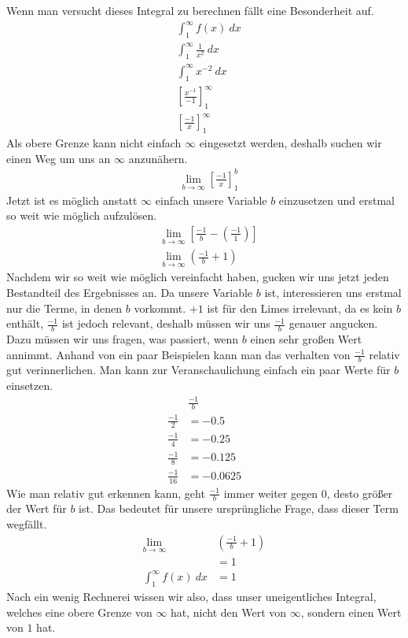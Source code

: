 \begin{flushleft}
    Wenn man versucht dieses Integral zu berechnen fällt eine Besonderheit auf.
    \begin{align}
        &\int_{1}^{\infty} f(x) \ dx \\
        &\int_{1}^{\infty} \frac{1}{x^2} \ dx \\
        &\int_{1}^{\infty} x^{-2} \ dx \\
        &\left[\frac{x^{-1}}{-1}\right]_{1}^{\infty} \\
        &\left[\frac{-1}{x}\right]_{1}^{\infty}
    \end{align}
    Als obere Grenze kann nicht einfach $\infty$ eingesetzt werden, deshalb suchen wir einen Weg um uns an $\infty$ anzunähern.
    \begin{align}
        &\lim_{b \to \infty} \left[ \frac{-1}{x}\right]_{1}^{b}
    \end{align}
    Jetzt ist es möglich anstatt $\infty$ einfach unsere Variable $b$ einzusetzen und erstmal so weit wie möglich aufzulösen.
    \begin{align}
        &\lim_{b \to \infty} \left[ \frac{-1}{b} - \left(\frac{-1}{1}\right)\right] \\
        &\lim_{b \to \infty} \left( \frac{-1}{b} + 1\right)
    \end{align}
    Nachdem wir so weit wie möglich vereinfacht haben, gucken wir uns jetzt jeden Bestandteil des Ergebnisses an.
    Da unsere Variable $b$ ist, interessieren uns erstmal nur die Terme, in denen $b$ vorkommt.
    $+1$ ist für den Limes irrelevant, da es kein $b$ enthält, $\frac{-1}{b}$ ist jedoch relevant, deshalb müssen wir uns $\frac{-1}{b}$ genauer angucken. \newline
    Dazu müssen wir uns fragen, was passiert, wenn $b$ einen sehr großen Wert annimmt.
    Anhand von ein paar Beispielen kann man das verhalten von $\frac{-1}{b}$ relativ gut verinnerlichen.
    Man kann zur Veranschaulichung einfach ein paar Werte für $b$ einsetzen.
    \begin{align}
        &\frac{-1}{b} \\ 
        \frac{-1}{2} &= -0.5 \\ 
        \frac{-1}{4} &= -0.25 \\ 
        \frac{-1}{8} &= -0.125 \\ 
        \frac{-1}{16} &= -0.0625
    \end{align}
    Wie man relativ gut erkennen kann, geht $\frac{-1}{b}$ immer weiter gegen $0$, desto größer der Wert für $b$ ist.
    Das bedeutet für unsere ursprüngliche Frage, dass dieser Term wegfällt.
    \begin{align}
        \lim_{b \to \infty} &\left( \frac{-1}{b} + 1\right) \\
        &=1 \\
        \int_{1}^{\infty} f(x) \ dx &= 1
    \end{align}
    Nach ein wenig Rechnerei wissen wir also, dass unser uneigentliches Integral, welches eine obere Grenze von $\infty$ hat, nicht den Wert von $\infty$, 
    sondern einen Wert von $1$ hat.
\end{flushleft}
